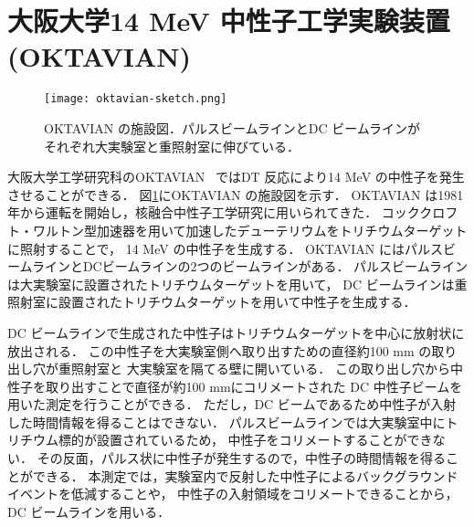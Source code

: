 \documentclass[../master]{subfiles}
\begin{document}
\section{大阪大学14 MeV 中性子工学実験装置 (OKTAVIAN)}
\begin{figure}
  \centering
  \texttt{[image: oktavian-sketch.png]}
  \caption[OKTAVIAN の施設図．]
          {OKTAVIAN の施設図．パルスビームラインとDC ビームラインがそれぞれ大実験室と重照射室に伸びている．}
  \label{pic::oktavian-sketch}
\end{figure}
大阪大学工学研究科のOKTAVIAN~\cite{oktavian} ではDT 反応により14 MeV の中性子を発生させることができる．
図\ref{pic::oktavian-sketch}にOKTAVIAN の施設図を示す．
OKTAVIAN は1981年から運転を開始し，核融合中性子工学研究に用いられてきた．
コッククロフト・ワルトン型加速器を用いて加速したデューテリウムをトリチウムターゲットに照射することで，
14 MeV の中性子を生成する．
OKTAVIAN にはパルスビームラインとDCビームラインの2つのビームラインがある．
パルスビームラインは大実験室に設置されたトリチウムターゲットを用いて，
DC ビームラインは重照射室に設置されたトリチウムターゲットを用いて中性子を生成する．

DC ビームラインで生成された中性子はトリチウムターゲットを中心に放射状に放出される．
この中性子を大実験室側へ取り出すための直径約100 mm の取り出し穴が重照射室と
大実験室を隔てる壁に開いている．
この取り出し穴から中性子を取り出すことで直径が約100 mmにコリメートされた
DC 中性子ビームを用いた測定を行うことができる．
ただし，DC ビームであるため中性子が入射した時間情報を得ることはできない．
パルスビームラインでは大実験室中にトリチウム標的が設置されているため，
中性子をコリメートすることができない．
その反面，パルス状に中性子が発生するので，中性子の時間情報を得ることができる．
本測定では，実験室内で反射した中性子によるバックグラウンドイベントを低減することや，
中性子の入射領域をコリメートできることから，DC ビームラインを用いる．
\end{document}
